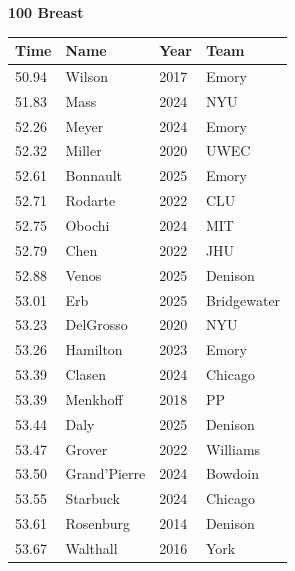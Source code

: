 \noindent\begin{minipage}[t]{0.98\textwidth}
\centering
\textbf{\textcolor{teamprimary}{100 Breast}}\par
\vspace{0.5em}
\centering
\small
\renewcommand{\arraystretch}{1.0}
\setlength{\tabcolsep}{4pt}
\begin{tabular}{@{}p{2.5cm}p{4.5cm}p{1.5cm}p{2.5cm}@{}}
\toprule
\textbf{Time} & \textbf{Name} & \textbf{Year} & \textbf{Team} \\
\midrule
50.94 & Wilson & 2017 & Emory \\
51.83 & Mass & 2024 & NYU \\
52.26 & Meyer & 2024 & Emory \\
52.32 & Miller & 2020 & UWEC \\
52.61 & Bonnault & 2025 & Emory \\
52.71 & Rodarte & 2022 & CLU \\
52.75 & Obochi & 2024 & MIT \\
52.79 & Chen & 2022 & JHU \\
52.88 & Venos & 2025 & Denison \\
53.01 & Erb & 2025 & Bridgewater \\
53.23 & DelGrosso & 2020 & NYU \\
53.26 & Hamilton & 2023 & Emory \\
53.39 & Clasen & 2024 & Chicago \\
53.39 & Menkhoff & 2018 & PP \\
53.44 & Daly & 2025 & Denison \\
53.47 & Grover & 2022 & Williams \\
53.50 & Grand'Pierre & 2024 & Bowdoin \\
53.55 & Starbuck & 2024 & Chicago \\
53.61 & Rosenburg & 2014 & Denison \\
53.67 & Walthall & 2016 & York \\
\bottomrule
\end{tabular}
\end{minipage}
\vspace{1.2em}
